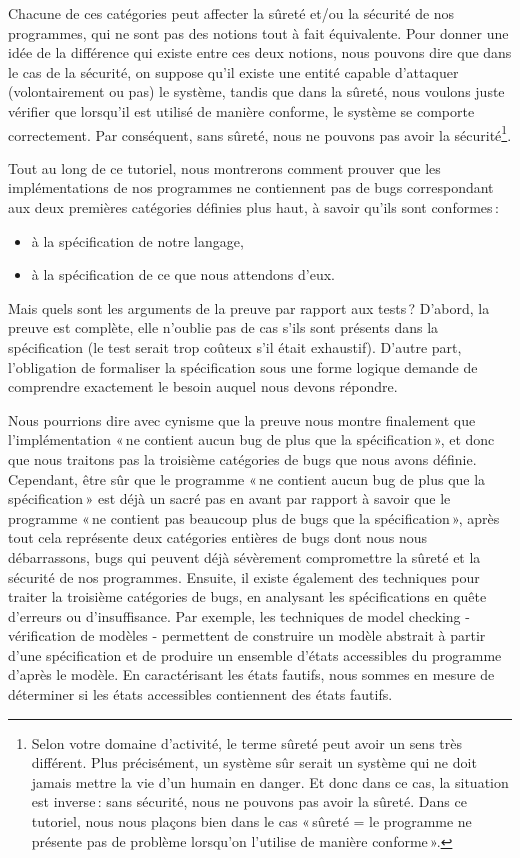 Chacune de ces catégories peut affecter la sûreté et/ou la sécurité de nos
programmes, qui ne sont pas des notions tout à fait équivalente. Pour donner
une idée de la différence qui existe entre ces deux notions, nous pouvons
dire que dans le cas de la sécurité, on suppose qu’il existe une entité
capable d’attaquer (volontairement ou pas) le système, tandis que dans la
sûreté, nous voulons juste vérifier que lorsqu’il est utilisé de manière
conforme, le système se comporte correctement. Par conséquent, sans sûreté,
nous ne pouvons pas avoir la sécurité\footnote{Selon votre domaine
d’activité, le terme sûreté peut avoir un sens très différent. Plus
précisément, un système sûr serait un système qui ne doit jamais mettre la
vie d’un humain en danger. Et donc dans ce cas, la situation est inverse :
sans sécurité, nous ne pouvons pas avoir la sûreté. Dans ce tutoriel, nous
nous plaçons bien dans le cas « sûreté = le programme ne présente pas de
problème lorsqu’on l’utilise de manière conforme ».}.


Tout au long de ce tutoriel, nous montrerons comment prouver que les
implémentations de nos programmes ne contiennent pas de bugs correspondant
aux deux premières catégories définies plus haut, à savoir qu’ils sont
conformes :


\begin{itemize}
\item à la spécification de notre langage,
\item à la spécification de ce que nous attendons d’eux.
\end{itemize}


Mais quels sont les arguments de la preuve par rapport aux tests ? D’abord,
la preuve est complète, elle n’oublie pas de cas s’ils sont présents dans la
spécification (le test serait trop coûteux s’il était exhaustif). D’autre
part, l’obligation de formaliser la spécification sous une forme logique
demande de comprendre exactement le besoin auquel nous devons répondre.

Nous pourrions dire avec cynisme que la preuve nous montre finalement que
l’implémentation « ne contient aucun bug de plus que la spécification », et
donc que nous traitons pas la troisième catégories de bugs que nous avons
définie. Cependant, être sûr que le programme « ne contient aucun bug de
plus que la spécification » est déjà un sacré pas en avant par rapport à
savoir que le programme « ne contient pas beaucoup plus de bugs que la
spécification », après tout cela représente deux catégories entières de bugs
dont nous nous débarrassons, bugs qui peuvent déjà sévèrement compromettre la
sûreté et la sécurité de nos programmes. Ensuite, il existe également des
techniques pour traiter la troisième catégories de bugs, en analysant les
spécifications en quête d’erreurs ou d’insuffisance. Par exemple, les
techniques de model checking - vérification de modèles - permettent de
construire un modèle abstrait à partir d’une spécification et de produire
un ensemble d’états accessibles du programme d’après le modèle. En
caractérisant les états fautifs, nous sommes en mesure de déterminer si les
états accessibles contiennent des états fautifs.


